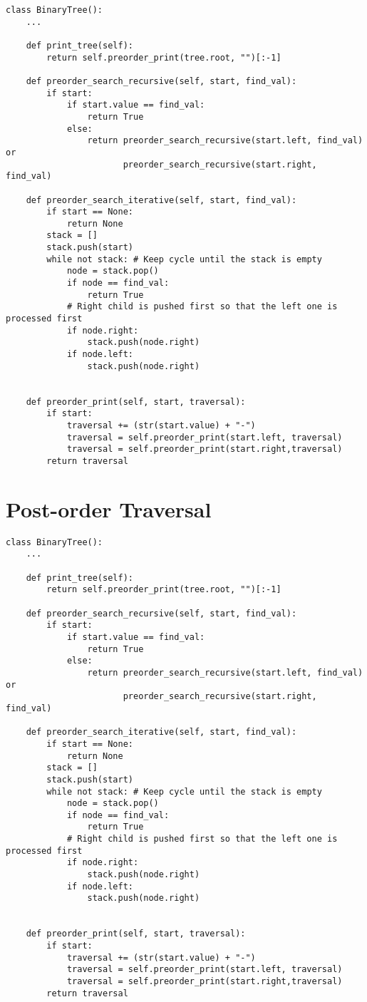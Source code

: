 \begin{lstlisting}[firstnumber=1, caption={Tree operations implementation.}]
class BinaryTree():
	...
	
	def print_tree(self):
		return self.preorder_print(tree.root, "")[:-1]
	
	def preorder_search_recursive(self, start, find_val):
		if start:
			if start.value == find_val:
				return True
			else:
				return preorder_search_recursive(start.left, find_val) or
					   preorder_search_recursive(start.right, find_val)
	
	def preorder_search_iterative(self, start, find_val):
		if start == None:
			return None
		stack = []
		stack.push(start)
		while not stack: # Keep cycle until the stack is empty
			node = stack.pop()
			if node == find_val:
				return True
			# Right child is pushed first so that the left one is processed first
			if node.right:
				stack.push(node.right)
			if node.left:
				stack.push(node.right)
		
		
	def preorder_print(self, start, traversal):
		if start:
			traversal += (str(start.value) + "-")
			traversal = self.preorder_print(start.left, traversal)
			traversal = self.preorder_print(start.right,traversal)
		return traversal
\end{lstlisting}

\section{Post-order Traversal}
\label{postorderappendix}

\begin{lstlisting}[firstnumber=1, caption={Tree operations implementation.}]
class BinaryTree():
	...
	
	def print_tree(self):
		return self.preorder_print(tree.root, "")[:-1]
	
	def preorder_search_recursive(self, start, find_val):
		if start:
			if start.value == find_val:
				return True
			else:
				return preorder_search_recursive(start.left, find_val) or
					   preorder_search_recursive(start.right, find_val)
	
	def preorder_search_iterative(self, start, find_val):
		if start == None:
			return None
		stack = []
		stack.push(start)
		while not stack: # Keep cycle until the stack is empty
			node = stack.pop()
			if node == find_val:
				return True
			# Right child is pushed first so that the left one is processed first
			if node.right:
				stack.push(node.right)
			if node.left:
				stack.push(node.right)
		
		
	def preorder_print(self, start, traversal):
		if start:
			traversal += (str(start.value) + "-")
			traversal = self.preorder_print(start.left, traversal)
			traversal = self.preorder_print(start.right,traversal)
		return traversal
\end{lstlisting}

